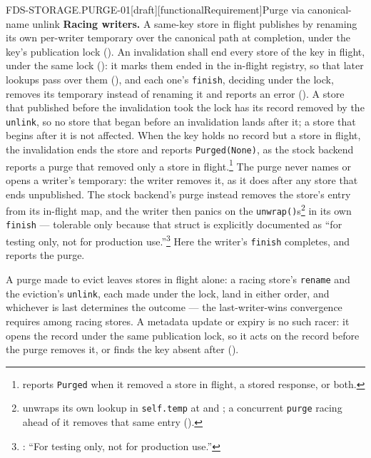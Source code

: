 \begin{requirement}{FDS-STORAGE.PURGE-01}[draft][functionalRequirement]{Purge via canonical-name unlink}
  \textbf{Racing writers.} A same-key store in flight publishes by renaming
  its own per-writer temporary over the canonical path at completion, under
  the key's publication lock (). An
  invalidation shall end every store of the key in flight, under the same
  lock (): it marks them ended in the
  in-flight registry, so that later lookups pass over them
  (), and each one's \texttt{finish},
  deciding under the lock, removes its temporary instead of renaming it and
  reports an error (). A store that published
  before the invalidation took the lock has its record removed by the
  \texttt{unlink}, so no store that began before an invalidation lands
  after it; a store that begins after it is not affected. When the key holds
  no record but a store in flight, the invalidation ends the store and
  reports \texttt{Purged(None)}, as the stock backend reports a purge that
  removed only a store in
  flight.\footnote{
  reports \texttt{Purged} when it removed a store in flight, a stored
  response, or both.} The purge never names or opens a writer's temporary:
  the writer removes it, as it does after any store that ends unpublished.
  The stock backend's purge instead removes the store's entry from its
  in-flight map, and the writer then panics on the
  \texttt{unwrap()}s\footnote{
  unwraps its own lookup in \texttt{self.temp} at
   and
  ; a concurrent
  \texttt{purge} racing ahead of it removes that same entry
  ().} in its own
  \texttt{finish} --- tolerable only because that struct is explicitly
  documented as ``for testing only, not for production
  use.''\footnote{: ``For testing only, not for production use.''} Here the
  writer's \texttt{finish} completes, and reports the purge.

  A purge made to evict leaves stores in flight alone: a racing store's
  \texttt{rename} and the eviction's \texttt{unlink}, each made under the
  lock, land in either order, and whichever is last determines the outcome
  --- the last-writer-wins convergence 
  requires among racing stores. A metadata update or expiry is no such
  racer: it opens the record under the same publication lock, so it acts on
  the record before the purge removes it, or finds the key absent after
  ().


\end{requirement}
